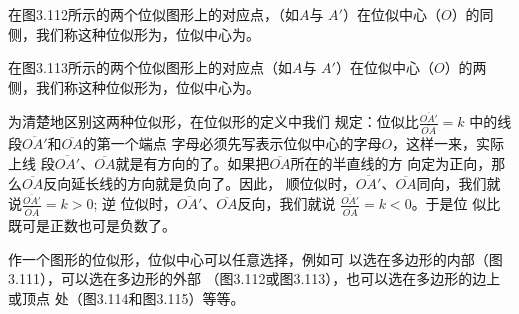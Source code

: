 在图3.112所示的两个位似图形上的对应点，（如$A$与
$A'$）在位似中心（$O$）的同侧，我们称这种位似形为，位似中心为。

\begin{figure}
\begin{tikzpicture}[rotate=10]
\end{tikzpicture}
    \caption{}
\end{figure}

\begin{figure}
    \centering
\begin{tikzpicture}[rotate=10]
\end{tikzpicture}
    \caption{}
\end{figure}

在图3.113所示的两个位似图形上的对应点（如$A$与
$A'$）在位似中心（$O$）的两侧，我们称这种位似形为，位似中心为。
    
为清楚地区别这两种位似形，在位似形的定义中我们
规定：位似比$\frac{\overline{OA'}}{\overline{OA}}=k$
中的线段$\overline{OA'}$和$\overline{OA}$的第一个端点
字母必须先写表示位似中心的字母$O$，这样一来，实际上线
段$\overline{OA'}$、$\overline{OA}$就是有方向的了。如果把$\overline{OA}$所在的半直线的方
向定为正向，那么$\overline{OA}$反向延长线的方向就是负向了。因此，
顺位似时，$\overline{OA'}$、$\overline{OA}$同向，我们就说$\frac{\overline{OA'}}{\overline{OA}}=k>0$; 逆
位似时，$\overline{OA'}$、$\overline{OA}$反向，我们就说
$\frac{\overline{OA'}}{\overline{OA}}=k<0$。于是位
似比既可是正数也可是负数了。

作一个图形的位似形，位似中心可以任意选择，例如可
以选在多边形的内部（图3.111），可以选在多边形的外部
（图3.112或图3.113），也可以选在多边形的边上或顶点
处（图3.114和图3.115）等等。

